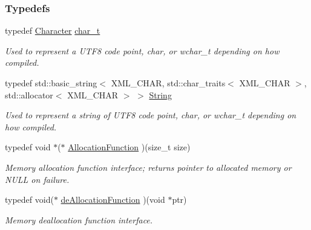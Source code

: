 \subsubsection*{Typedefs}
\begin{DoxyCompactItemize}
\item 
typedef \hyperlink{namespacephys_a3098bae5b0a3cd16eec331f766cc562b}{Character} \hyperlink{namespacephys_1_1xml_afc87705cd1c2917d87b879715a2d8f6e}{char\_\-t}
\begin{DoxyCompactList}\small\item\em Used to represent a UTF8 code point, char, or wchar\_\-t depending on how compiled. \item\end{DoxyCompactList}\item 
typedef std::basic\_\-string$<$ XML\_\-CHAR, std::char\_\-traits$<$ XML\_\-CHAR $>$, std::allocator$<$ XML\_\-CHAR $>$ $>$ \hyperlink{namespacephys_1_1xml_a4d8ca7638328d16d303e5a4c849f4704}{String}
\begin{DoxyCompactList}\small\item\em Used to represent a string of UTF8 code point, char, or wchar\_\-t depending on how compiled. \item\end{DoxyCompactList}\item 
\hypertarget{namespacephys_1_1xml_a6d772c4cf52d017d4d6ad68ddcbd493f}{
typedef void $\ast$($\ast$ \hyperlink{namespacephys_1_1xml_a6d772c4cf52d017d4d6ad68ddcbd493f}{AllocationFunction} )(size\_\-t size)}
\label{d9/d27/namespacephys_1_1xml_a6d772c4cf52d017d4d6ad68ddcbd493f}

\begin{DoxyCompactList}\small\item\em Memory allocation function interface; returns pointer to allocated memory or NULL on failure. \item\end{DoxyCompactList}\item 
\hypertarget{namespacephys_1_1xml_af98b1cb6640aa712180aad89a1c776d8}{
typedef void($\ast$ \hyperlink{namespacephys_1_1xml_af98b1cb6640aa712180aad89a1c776d8}{deAllocationFunction} )(void $\ast$ptr)}
\label{d9/d27/namespacephys_1_1xml_af98b1cb6640aa712180aad89a1c776d8}

\begin{DoxyCompactList}\small\item\em Memory deallocation function interface. \item\end{DoxyCompactList}\end{DoxyCompactItemize}
